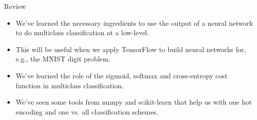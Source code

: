 \documentclass[12pt,t]{beamer}
\begin{document}
\begin{frame}{Review}
\begin{itemize}
\item We've learned the necessary ingredients  to use the output of a neural network to do multiclass classification at a low-level.
\item This will be useful when we apply TensorFlow to build neural networks for, e.g., the MNIST digit problem.
\item We've learned the role of the sigmoid, softmax and cross-entropy cost function in multiclass classification.
\item We've seen some tools from numpy and scikit-learn that help us with one hot encoding and one vs. all classification schemes.
\end{itemize}
\end{frame}
\end{document}
